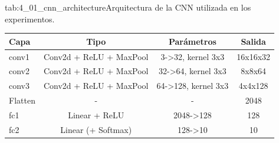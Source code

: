 \begin{table}{tab:4_01_cnn_architecture}{Arquitectura de la CNN utilizada en los experimentos.}
\small
\begin{tabular}{lccc}
\toprule
\textbf{Capa} & \textbf{Tipo} & \textbf{Parámetros} & \textbf{Salida} \\
\midrule
conv1 & Conv2d + ReLU + MaxPool & 3->32, kernel 3x3 & 16x16x32 \\
conv2 & Conv2d + ReLU + MaxPool & 32->64, kernel 3x3 & 8x8x64 \\
conv3 & Conv2d + ReLU + MaxPool & 64->128, kernel 3x3 & 4x4x128 \\
Flatten & - & - & 2048 \\
fc1 & Linear + ReLU & 2048->128 & 128 \\
fc2 & Linear (+ Softmax) & 128->10 & 10 \\
\bottomrule
\end{tabular}
\end{table}